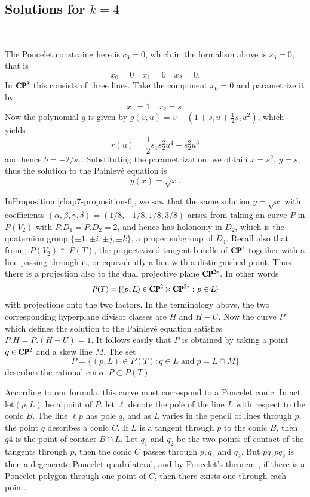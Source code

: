 \subsection{Solutions for \boldmath$k=4$}\label{chap7-subsec-6.2}
~

\smallskip
\noindent
The Poncelet constraing here is $c_{3}=0$, which in the formalism above is $s_{3}=0$, that is
$$
x_{0}=0 \quad x_{1}=0 \quad x_{2}=0.
$$
In $\mathbf{C}\mathbf{P}^{3}$ this consists of three lines. Take the component $x_{0}=0$ and parametrize it by
$$
x_{1}=1 \quad x_{2}=s.
$$
Now the polynomial $g$ is given by $g(v,u)=v-(1+s_{1}u+\frac{1}{2}s_{2}u^{2})$, which yields
$$
r(u) = \dfrac{1}{2}s_{1}s_{2}^{2}u^{4} +s_{2}^{2}u^{3}
$$
and hence $b=-2/s_{1}$. Substituting the parametrization, we obtain $x=s^{2}$, $y=s$, thus the solution to the
 Painlev\'e equation is
$$
y(x) = \sqrt{x}.
$$

\begin{remark*}
In\pageoriginale Proposition \ref{chap7-proposition-6}, we saw that the same solution $y=\sqrt{x}$ with coefficients $(\alpha, \beta,\gamma, \delta)=(1/8, -1/8, 1/8, 3/8)$ arises from taking an curve $P$ in $P(V_{2})$ with $P.D_{1} =P.D_{2}=2$, and hence has holonomy in $D_{2}$, which is the quaternion group $\{\pm 1, \pm i, \pm j, \pm k\}$, a proper subgroup of $\tilde{D}_{4}$. Recall also that from \cite{chap7-key16}, $P(V_{2}) \cong P(T)$, the projectivized tangent bundle of $\mathbf{C}\mathbf{P}^{2}$ together with a line passing through it, or equivalently a line with a distinguished point. Thus there is a projection also to the dual projective plane $\mathbf{C}\mathbf{P}^{2*}$. In other words
$$
P(T)=\{(p, L) \in \mathbf{C}\mathbf{P}^{2} \times \mathbf{C}\mathbf{P}^{2*} : p \in L\}
$$
with projections onto the two factors. In the terminology above, the two corresponding hyperplane divisor classes are $H$ and $H-U$. Now the curve $P$ which defines the solution to the Painlev\'e equation satisfies $P.H =P.(H-U)=1$. It follows easily that $P$ is obtained by taking a point $q\in \mathbf{C}\mathbf{P}^{2}$ and a skew line $M$.  The set
$$
P=\{(p, L) \in P(T) :q \in L \; \text{and} \; p = L\cap M\}
$$
describes the rational curve $P\subset P(T)$.

According to our formula, this curve must correspond to a Poncelet conic. In act, let$(p, L)$ be a point of $P$, let $\ell$ denote the pole of the line $L$ with respect to the conic $B$. The line $\ell p$ has pole $q$, and as $L$ varies in the pencil of lines through $p$, the point $q$ describes a conic $C$. If $L$ is a tangent through $p$ to the conic $B$, then $q4$ is the point of contact $B \cap L$. Let $q_{1}$ and $q_{2}$ be the two points of contact of the tangents through $p$, then the conic $C$ passes through $p, q_{1}$ and $q_{2}$. But $pq_{1}pq_{2}$ is then a degenerate Poncelet quadrilateral, and by Poncelet's theorem \cite{chap7-key3}, if there is a Poncelet polygon through one point of $C$, then there exists one through each point.
\end{remark*}

